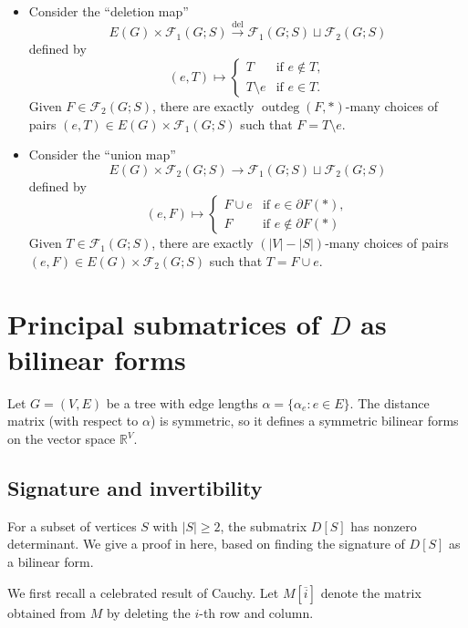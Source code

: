 \documentclass[12pt]{amsart}
\theoremstyle{definition}
\newcommand{\RR}{\mathbb{R}}
\newcommand{\trees}{\mathcal{F}_1}
\newcommand{\forests}{\mathcal{F}}
\DeclareMathOperator{\outdeg}{outdeg}
\begin{document}
\begin{itemize}[leftmargin=*]
\item Consider the ``deletion map''
\[
	E(G) \times \trees(G;S) \xrightarrow{\mathrm{del}} \trees(G;S) \sqcup \forests_2(G;S)
\]
defined by
\[
	(e, T) \mapsto \begin{cases}
	T &\text{if } e\not\in T,\\
	T \setminus e &\text{if } e\in T.
	\end{cases}
\]
Given $F \in \forests_2(G;S)$,
there are exactly $\outdeg(F, *)$-many choices of pairs $(e, T) \in E(G) \times \trees(G;S)$ such that $F = T \setminus e$.
\medskip
\item Consider the ``union map'' 
\[
	E(G) \times \forests_2(G;S) \longrightarrow \trees(G;S) \sqcup \forests_2(G;S)
\]
defined by
\[
	(e, F) \mapsto \begin{cases}
		F \cup e &\text{if } e \in \partial F(*), \\
		F &\text{if } e \not\in \partial F(*)
	\end{cases}
\]
Given $T \in \trees(G; S)$,  
there are exactly $(|V| - |S|)$-many choices of pairs $(e, F) \in E(G) \times \forests_2(G; S)$ such that $T = F \cup e$.
\end{itemize}



\section{Principal submatrices of \texorpdfstring{$D$}{D} as bilinear forms}
\label{sec:distance_prelim}

Let $G=(V, E)$ be a tree with edge lengths $\alpha = \{\alpha_e \colon e\in E\}$. The {distance matrix} (with respect to $\alpha$) is symmetric, so it defines a symmetric bilinear forms on the vector space $\RR^V$.


\subsection{Signature and invertibility}\label{sec:signature}

For a subset of vertices $S$ with $|S| \geq 2$, the submatrix $D[S]$ has nonzero determinant. 
We give a proof in here, based on finding the signature of $D[S]$ as a bilinear form.

We first recall a celebrated result of Cauchy.
Let $M[\overline{i}]$ denote the matrix obtained from $M$ by deleting the $i$-th row and column.
\end{document}
